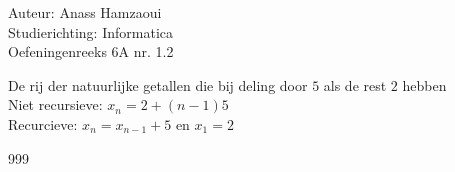 \documentclass[a4paper]{article}
\begin{document}
  
\noindent \large Auteur: Anass Hamzaoui \\
\noindent \large Studierichting: Informatica\\
\noindent \large Oefeningenreeks 6A nr. 1.2\\

\medskip

\normalsize

De rij der natuurlijke getallen die bij deling door $5$ als de rest $2$ hebben\\

Niet recursieve: $x_n = 2+(n-1)5$\\

Recurcieve: $x_n = x_{n-1} + 5$ en $x_1 = 2$\\

\begin{thebibliography}{999}
\end{thebibliography}
\end{document}
